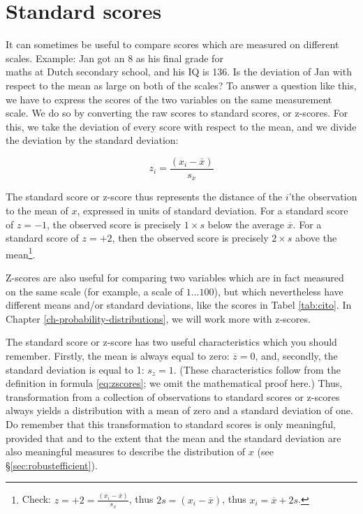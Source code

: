 \documentclass[
]{book}
\begin{document}
\section{Standard scores}\label{sec:standardscores}

It can sometimes be useful to compare scores which are measured on
different scales. Example: Jan got an 8 as his final grade for\\
maths at Dutch secondary school, and his IQ is 136. Is the deviation of Jan with
respect to the mean as large on both of the scales? To answer a question
like this, we have to express the scores of the two variables on the
same measurement scale. We do so by converting the raw scores to
standard scores, or z-scores. For this, we take the deviation of every
score with respect to the mean, and we divide the deviation by the
standard deviation:

\begin{equation}
    z_i = \frac{(x_i-\overline{x})}{s_x}
   \label{eq:zscores}
\end{equation}

The standard score or z-score
thus represents the distance of the \(i\)'the observation to the mean
of \(x\), expressed in units of standard deviation. For a
standard score of \(z=-1\), the observed score is precisely \(1 \times s\)
below the average \(\overline{x}\). For a standard score of \(z=+2\),
then the observed score is precisely \(2 \times s\) above the
mean\footnote{Check: \(z = +2 = \frac{(x_i-\overline{x})}{s_x}\), thus \(2 s = (x_i-\overline{x})\), thus \(x_i = \overline{x}+2s\).}.

Z-scores are also useful for comparing two variables which
are in fact measured on the same scale (for example, a scale of
\(1 \dots 100\)), but which nevertheless have different means and/or
standard deviations, like the scores in
Tabel \ref{tab:cito}.
In Chapter \ref{ch-probability-distributions}, we will work more with z-scores.

The standard score or z-score has two useful characteristics which you
should remember. Firstly, the mean is always equal to zero:
\(\overline{z}=0\), and, secondly, the standard deviation is equal to 1:
\(s_z = 1\). (These characteristics follow from the definition in
formula \eqref{eq:zscores}; we omit the mathematical proof here.) Thus,
transformation from a collection of observations to
standard scores or z-scores always yields a distribution with
a mean of zero and a standard deviation of one. Do remember that
this transformation to standard scores is only meaningful, provided that and
to the extent that the mean and the standard deviation are also meaningful measures
to describe the distribution of \(x\) (see §\ref{sec:robustefficient}).
\end{document}
